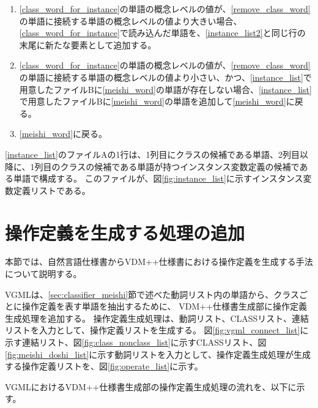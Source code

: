 \begin{enumerate}
\begin{enumerate}
\begin{enumerate}
\begin{enumerate}
                            \item \ref{class_word_for_instance}の単語の概念レベルの値が、\ref{remove_class_word}の単語に接続する単語の概念レベルの値より大きい場合、\ref{class_word_for_instance}で読み込んだ単語を、\ref{instance_list2}と同じ行の末尾に新たな要素として追加する。
                            \item \ref{class_word_for_instance}の単語の概念レベルの値が、\ref{remove_class_word}の単語に接続する単語の概念レベルの値より小さい、かつ、\ref{instance_list}で用意したファイルBに\ref{meishi_word}の単語が存在しない場合、\ref{instance_list}で用意したファイルBに\ref{meishi_word}の単語を追加して\ref{meishi_word}に戻る。
                            \item \ref{meishi_word}に戻る。
                        \end{enumerate}
                \end{enumerate}
        \end{enumerate}
\end{enumerate}

\ref{instance_list}のファイルAの1行は、1列目にクラスの候補である単語、2列目以降に、1列目のクラスの候補である単語が持つインスタンス変数定義の候補である単語で構成する。
このファイルが、図\ref{fig:instance_list}に示すインスタンス変数定義リストである。

\section{操作定義を生成する処理の追加}
\label{sec:operate_generate}
本節では、自然言語仕様書からVDM++仕様書における操作定義を生成する手法について説明する。

VGMLは、\ref{sec:classifier_meishi}節で述べた動詞リスト内の単語から、クラスごとに操作定義を表す単語を抽出するために、
VDM++仕様書生成部に操作定義生成処理を追加する。
操作定義生成処理は、動詞リスト、CLASSリスト、連結リストを入力として、操作定義リストを生成する。
図\ref{fig:vgml_connect_list}に示す連結リスト、図\ref{fig:class_nonclass_list}に示すCLASSリスト、図\ref{fig:meishi_doshi_list}に示す動詞リストを入力として、操作定義生成処理が生成する操作定義リストを、図\ref{fig:operate_list}に示す。

VGMLにおけるVDM++仕様書生成部の操作定義生成処理の流れを、以下に示す。

